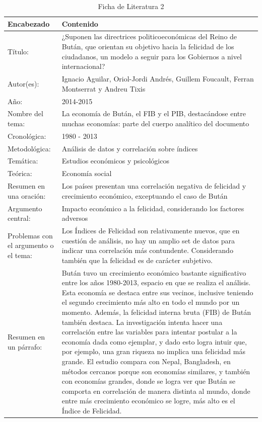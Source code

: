 \begin{table}[htbp]
    \caption{Ficha de Literatura 2}
    \begin{center}
        \begin{tabular}{  m{3cm} | m{12cm}  }
        \hline\textbf{ Encabezado} & \textbf{Contenido }\\ \hline
        Título: & ¿Suponen las directrices politicoeconómicas del Reino de Bután, que orientan su objetivo hacia la felicidad de los ciudadanos, un modelo a seguir para los Gobiernos a nivel internacional? \\ \hline
        Autor(es): &  Ignacio Aguilar, Oriol-Jordi Andrés, Guillem Foucault, Ferran Montserrat y Andreu Tixis\\ \hline
        Año: & 2014-2015 \\ \hline
        Nombre del tema: & La economía de Bután, el FIB y el PIB, destacándose entre muchas economías: parte del cuerpo analítico del documento \\ \hline
        Cronológica: & 1980 - 2013 \\ \hline
        Metodológica: & Análisis de datos y correlación sobre índices \\ \hline
        Temática: & Estudios económicos y psicológicos \\ \hline
        Teórica: & Economía social \\ \hline
        Resumen en una oración: & Los países presentan una correlación negativa de felicidad y crecimiento económico, exceptuando el caso de Bután \\ \hline
        Argumento central: & Impacto económico a la felicidad, considerando los factores adversos \\ \hline
        Problemas con el argumento o el tema: & Los Índices de Felicidad son relativamente nuevos, que en cuestión de análisis, no hay un amplio set de datos para indicar una correlación más contundente. Considerando también que la felicidad es de carácter subjetivo.  \\ \hline
        Resumen en un párrafo: & Bután tuvo un crecimiento económico bastante significativo entre los años 1980-2013, espacio en que se realiza el análisis. Esta economía se destaca entre sus vecinos, inclusive teniendo el segundo crecimiento más alto en todo el mundo por un momento. Además, la felicidad interna bruta (FIB) de Bután también destaca. La investigación intenta hacer una correlación entre las variables para intentar postular a la economía dada como ejemplar, y dado esto logra intuir que, por ejemplo, una gran riqueza no implica una felicidad más grande. El estudio compara con Nepal, Bangladesh, en métodos cercanos porque son economías similares, y también con economías grandes, donde se logra ver que Bután se comporta en correlación de manera distinta al mundo, donde entre más crecimiento económico se logre, más alto es el Índice de Felicidad.   \\ \hline
        \end{tabular}
    \end{center}
\end{table}

